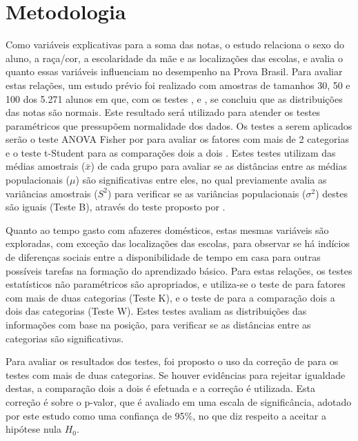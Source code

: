 

\chapter{Metodologia}
Como variáveis explicativas para a soma das notas, o estudo relaciona o sexo do aluno, a raça/cor, a escolaridade da mãe e as localizações das escolas,
e avalia o quanto essas variáveis influenciam no desempenho na Prova Brasil. Para avaliar estas relações, um estudo prévio foi realizado
com amostras de tamanhos 30, 50 e 100 dos 5.271 alunos em que, com os testes , 
e , se concluiu que as distribuições das notas são normais. Este resultado será utilizado para atender
os testes paramétricos que pressupõem normalidade dos dados. Os testes a serem aplicados serão o teste ANOVA Fisher por  para 
avaliar os fatores com mais de 2 categorias e o teste t-Student para as comparações dois a dois \cite{o1908student}.
Estes testes utilizam das médias amostrais ($\bar{x}$) de cada grupo para avaliar se as distâncias entre as médias 
populacionais ($\mu$) são significativas entre eles, no qual previamente avalia as
variâncias amostrais ($S^2$) para verificar se as variâncias populacionais ($\sigma^2$) destes são iguais (Teste B), através do teste proposto por .

Quanto ao tempo gasto com afazeres domésticos, estas mesmas variáveis são exploradas, com exceção das localizações das escolas,
para observar se há indícios de diferenças sociais entre a disponibilidade de tempo em casa para outras possíveis 
tarefas na formação do aprendizado básico. Para estas relações, os testes estatísticos não paramétricos são apropriados,
e utiliza-se o teste de  para fatores com mais de duas categorias (Teste K), e o
teste de  para a comparação dois a dois das categorias (Teste W). Estes testes avaliam as
distribuições das informações com base na posição, para verificar se as distâncias entre as categorias são significativas.

Para avaliar os resultados dos testes, foi proposto o uso da correção de  para os 
testes com mais de duas categorias. Se houver evidências para rejeitar igualdade destas, a comparação dois a dois é
efetuada e a correção é utilizada. Esta correção é sobre o p-valor, que é avaliado em uma escala de significância,
adotado por este estudo como uma confiança de 95\%, no que diz respeito a aceitar a hipótese nula $H_0$.